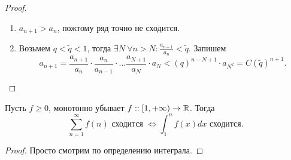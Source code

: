 \begin{prop}
\begin{description}
\begin{proof}
		$ $
		\begin{enumerate}
		    \item $ a_{n+1} > a_n$, пожтому ряд точно не сходится.
		    \item Возьмем $ q < \tilde q < 1$, тогда  $ \exists  N ~ \forall  n > N \colon \frac{a_{n+1}}{a_n} < \tilde q$.
			Запишем 
			 \[
			     a_{n+1} = \frac{a_{n+1}}{a_n} \cdot \frac{a_n}{a_{n-1}} \cdot  \ldots \frac{a_{N+1}}{a_N} \cdot a_N < (q)^{n - N + 1} \cdot a _{N^2} = C(\tilde q)^{n+1}
			.\] 
		\end{enumerate}
	    \end{proof}
	\item[\boxed{\text{Интегральный признак}}] Пусть $f \ge 0 $, монотонно убывает $ f::[1, + \infty) \to  \mathbb{R}$. Тогда 
	    \[
		\sum_{n = 1}^{\infty} f(n) \text{ сходится } \Longleftrightarrow \int_{1}^{n} f(x) dx \text{ сходится}
	    .\] 
	    \begin{proof}
	        Просто смотрим по определению интеграла.
	    \end{proof}
    \end{description}
\end{prop}
